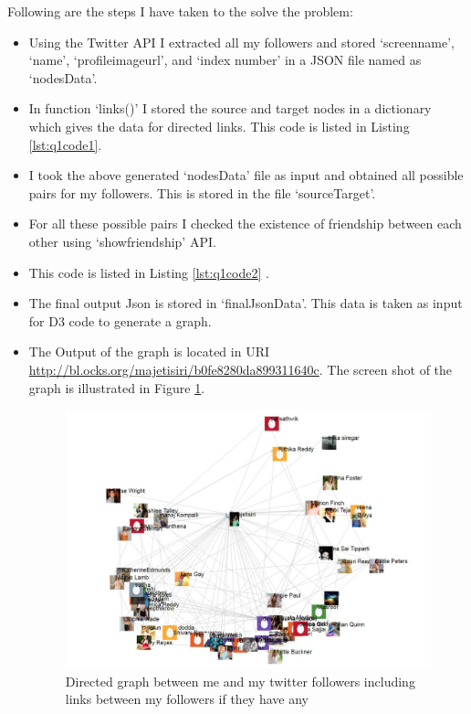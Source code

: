 Following are the steps I have taken to the solve the problem:
\begin{itemize}
\item Using the Twitter API I extracted all my followers and stored `screen\textunderscore name', `name', `profile\textunderscore image\textunderscore url', and `index number' in a JSON file named as `nodesData'.
\item In function `links()' I stored the source and target nodes in a dictionary which gives the data for directed links. This code is listed in Listing \ref{lst:q1code1}.
\item I took the above generated `nodesData' file as input and obtained all possible pairs for my followers. This is stored in the file `sourceTarget'. 
\item For all these possible pairs I checked the existence of friendship between each other using `show\textunderscore friendship' API. 
\item This code is listed in Listing \ref{lst:q1code2} .
\item The final output Json is stored in `finalJsonData'. This data is taken as input for D3 code to generate a graph.
\item The Output of the graph is located in URI \url {http://bl.ocks.org/majetisiri/b0fe8280da899311640c}. The screen shot of the graph is illustrated in Figure \ref{fig:q1fig2}.
\begin{figure}[h!]
\begin{center}
\hspace*{-3cm} 
\includegraphics[scale=0.55, keepaspectratio=true]{figures/1.JPG}
\caption{Directed graph between me and my twitter followers including links between my followers if they have any}
\label{fig:q1fig2}
\end{center}
\end{figure}
\end{itemize}

